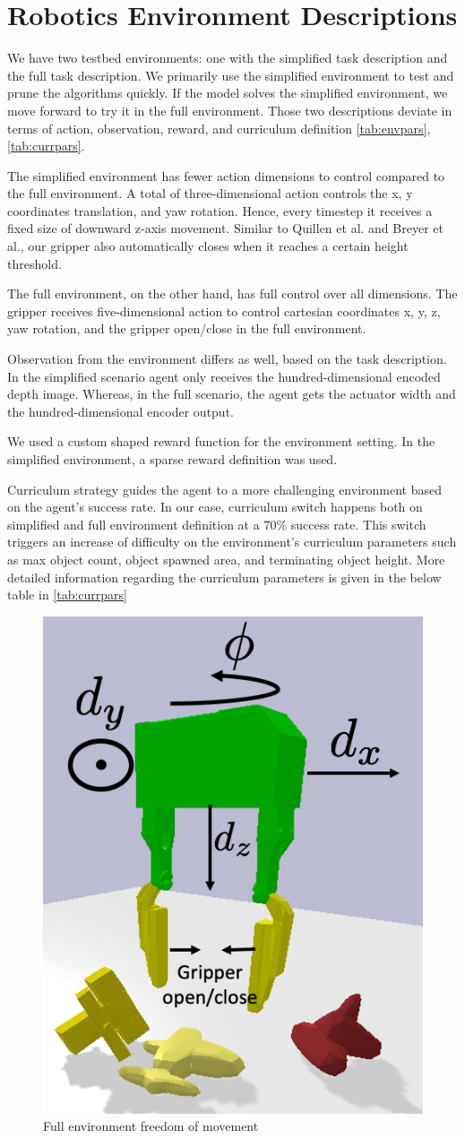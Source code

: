 \section{Robotics Environment Descriptions}

We have two testbed environments: one with the simplified task description and the full task description. We primarily use the simplified environment to test and prune the algorithms quickly. If the model solves the simplified environment, we move forward to try it in the full environment. Those two descriptions deviate in terms of action, observation, reward, and curriculum definition \ref{tab:envpars}, \ref{tab:currpars}. 

The simplified environment has fewer action dimensions to control compared to the full environment. A total of three-dimensional action controls the x, y coordinates translation, and yaw rotation. Hence, every timestep it receives a fixed size of downward z-axis movement. Similar to Quillen et al. and Breyer et al., our gripper also automatically closes when it reaches a certain height threshold.

The full environment, on the other hand, has full control over all dimensions. The gripper receives five-dimensional action to control cartesian coordinates x, y, z, yaw rotation, and the gripper open/close in the full environment. 

Observation from the environment differs as well, based on the task description. In the simplified scenario agent only receives the hundred-dimensional encoded depth image. Whereas, in the full scenario, the agent gets the actuator width and the hundred-dimensional encoder output.

We used a custom shaped reward function for the environment setting. In the simplified environment, a sparse reward definition was used.

Curriculum strategy guides the agent to a more challenging environment based on the agent's success rate. In our case, curriculum switch happens both on simplified and full environment definition at a \(70\%\) success rate. This switch triggers an increase of difficulty on the environment's curriculum parameters such as max object count, object spawned area, and terminating object height. More detailed information regarding the curriculum parameters is given in the below table in \ref{tab:currpars}

\begin{figure}[htbp]
    \centering
    \includegraphics[width=0.3\linewidth]{figures/freedomDim.png}
\caption{Full environment freedom of movement} \label{fig:breyer}

\end{figure}


